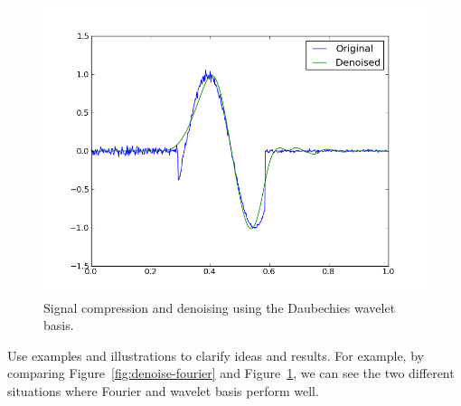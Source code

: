 \documentclass[10pt,conference,compsocconf]{IEEEtran}
\begin{document}
\begin{figure}[htbp]
  \centering
  \includegraphics[width=\columnwidth]{local_wdenoised_1d}
  \vspace{-3mm}
  \caption{Signal compression and denoising using the Daubechies wavelet basis.}
  \label{fig:denoise-wavelet}
\end{figure}

Use examples and illustrations to clarify ideas and results. For
example, by comparing Figure~\ref{fig:denoise-fourier} and
Figure~\ref{fig:denoise-wavelet}, we can see the two different
situations where Fourier and wavelet basis perform well. 







\end{document}
